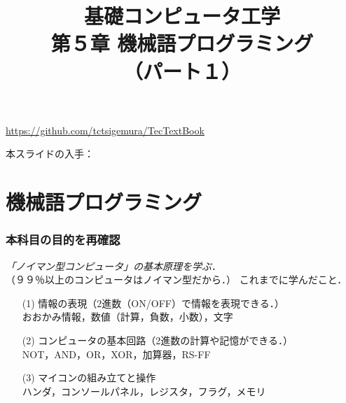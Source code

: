 \documentclass[handout]{beamer}        %
\begin{document}
\title{基礎コンピュータ工学\\第５章 機械語プログラミング\\（パート１）}
\date{}

\begin{frame}
  \titlepage
  \centerline{\url{https://github.com/tctsigemura/TecTextBook}}
  \vfill
  \centerline{本スライドの入手：
    }
\end{frame}


\section{機械語プログラミング}
\begin{frame}
  \frametitle{本科目の目的を再確認}
  \emph{「ノイマン型コンピュータ」の基本原理を学ぶ．}\\
  （９９％以上のコンピュータはノイマン型だから．）
  \vfill
  これまでに学んだこと．
  \begin{enumerate}
    \item[(1)] 情報の表現（2進数（ON/OFF）で情報を表現できる．）\\
      おおかみ情報，数値（計算，負数，小数），文字
      \vfill
    \item[(2)] コンピュータの基本回路（2進数の計算や記憶ができる．）\\
      NOT，AND，OR，XOR，加算器，RS-FF
      \vfill
    \item[(3)] マイコンの組み立てと操作\\
      ハンダ，コンソールパネル，レジスタ，フラグ，メモリ
  \end{enumerate}
  \vfill
\end{frame}
\end{document}
